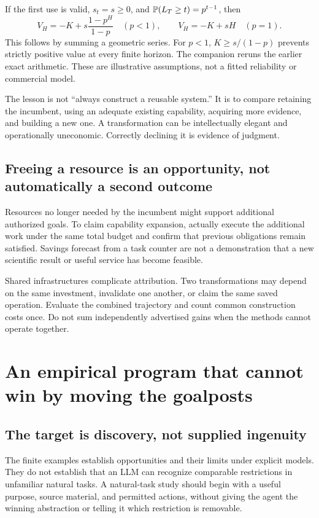 \documentclass[11pt,letterpaper]{article}
\theoremstyle{remark}\newtheorem{remark}{Remark}[section]
\begin{document}
If the first use is valid, $s_t=s\ge0$, and $\mathbb P(L_T\ge t)=p^{t-1}$, then
\begin{equation}
 V_H=-K+s\frac{1-p^H}{1-p}\quad(p<1),\qquad V_H=-K+sH\quad(p=1).
\end{equation}
This follows by summing a geometric series. For $p<1$, $K\ge s/(1-p)$ prevents strictly positive value at every finite horizon. The companion reruns the earlier exact arithmetic. These are illustrative assumptions, not a fitted reliability or commercial model.

The lesson is not ``always construct a reusable system.'' It is to compare retaining the incumbent, using an adequate existing capability, acquiring more evidence, and building a new one. A transformation can be intellectually elegant and operationally uneconomic. Correctly declining it is evidence of judgment.

\subsection{Freeing a resource is an opportunity, not automatically a second outcome}
Resources no longer needed by the incumbent might support additional authorized goals. To claim capability expansion, actually execute the additional work under the same total budget and confirm that previous obligations remain satisfied. Savings forecast from a task counter are not a demonstration that a new scientific result or useful service has become feasible.

Shared infrastructures complicate attribution. Two transformations may depend on the same investment, invalidate one another, or claim the same saved operation. Evaluate the combined trajectory and count common construction costs once. Do not sum independently advertised gains when the methods cannot operate together.

\section{An empirical program that cannot win by moving the goalposts}\label{sec:evaluation}
\subsection{The target is discovery, not supplied ingenuity}
The finite examples establish opportunities and their limits under explicit models. They do not establish that an LLM can recognize comparable restrictions in unfamiliar natural tasks. A natural-task study should begin with a useful purpose, source material, and permitted actions, without giving the agent the winning abstraction or telling it which restriction is removable.
\end{document}
